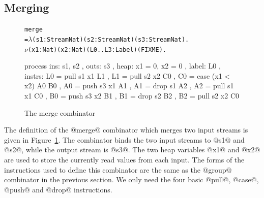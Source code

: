 


\subsection{Merging}
\begin{figure}
\begin{alltt}
 merge
   = \(\lambda\) (s1: Stream Nat) (s2: Stream Nat) (s3: Stream Nat). 
     \(\nu\) (x1: Nat)  (x2: Nat) (L0..L3: Label) (FIXME).
\end{alltt}
\begin{code}
     process
     { ins:    { s1, s2 }
     , outs:   { s3 }
     , heap:   { x1 = 0, x2 = 0 }
     , label:  L0
     , instrs: { L0 = pull s1 x1     L1 {}
               , L1 = pull s2 x2     C0 {}
               , C0 = case (x1 < x2) A0 {}  B0 {}
               , A0 = push s3 x1     A1 {}
               , A1 = drop s1        A2 {}
               , A2 = pull s1 x1     C0 {}
               , B0 = push s3 x2     B1 {}
               , B1 = drop s2        B2 {}
               , B2 = pull s2  x2    C0 {} } }
\end{code}
\caption{The merge combinator}
\label{fig:Process:Merge}
\end{figure}

The definition of the @merge@ combinator which merges two input streams is given in Figure~\ref{fig:Process:Merge}. The combinator binds the two input streams to @s1@ and @s2@, while the output stream is @s3@. The two heap variables @x1@ and @x2@ are used to store the currently read values from each input. The forms of the instructions used to define this combinator are the same as the @group@ combinator in the previous section. We only need the four basic @pull@, @case@, @push@ and @drop@ instructions.

